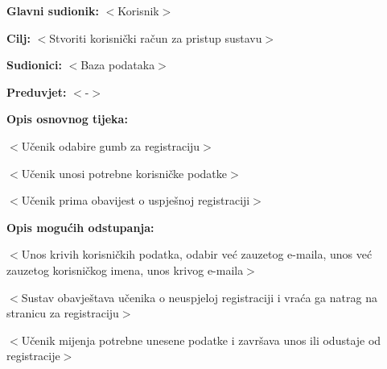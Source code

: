 					\noindent {}
					\begin{packed_item}
	
						\item \textbf{Glavni sudionik: }$<$Korisnik$>$
						\item  \textbf{Cilj:} $<$Stvoriti korisnički račun za pristup sustavu$>$
						\item  \textbf{Sudionici:} $<$Baza podataka$>$
						\item  \textbf{Preduvjet:} $<$-$>$
						\item  \textbf{Opis osnovnog tijeka:}
						
						\item[] \begin{packed_enum}
	
							\item $<$Učenik odabire gumb za registraciju$>$
							\item $<$Učenik unosi potrebne korisničke podatke$>$
							\item $<$Učenik prima obavijest o uspješnoj registraciji$>$
						\end{packed_enum}
						
						\item  \textbf{Opis mogućih odstupanja:}
						
						\item[] \begin{packed_item}
	
							\item[2.a] $<$Unos krivih korisničkih podatka, odabir već zauzetog e-maila, unos već zauzetog korisničkog imena, unos krivog e-maila$>$
							\item[] \begin{packed_enum}
								
								\item $<$Sustav obavještava učenika o neuspjeloj registraciji i vraća ga natrag na stranicu za registraciju$>$
								\item $<$Učenik mijenja potrebne unesene podatke i završava unos ili odustaje od registracije$>$
								
							\end{packed_enum}
							
						\end{packed_item}
					\end{packed_item}


